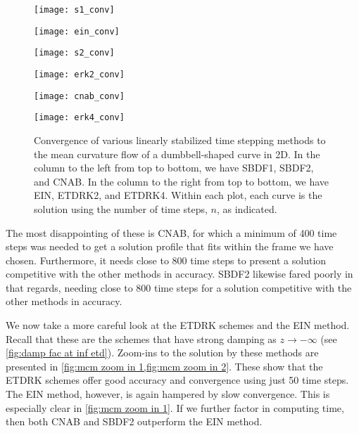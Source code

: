 \begin{figure}[htb!]
        \centering
\begin{minipage}{0.48\textwidth}
        \texttt{[image: s1\_conv]}
\end{minipage}
\begin{minipage}{0.48\textwidth}
        \texttt{[image: ein\_conv]}
\end{minipage}
\begin{minipage}{0.48\textwidth}
        \texttt{[image: s2\_conv]}
\end{minipage}
\begin{minipage}{0.48\textwidth}
        \texttt{[image: erk2\_conv]}
\end{minipage}
\begin{minipage}{0.48\textwidth}
        \texttt{[image: cnab\_conv]}
\end{minipage}
\begin{minipage}{0.48\textwidth}
        \texttt{[image: erk4\_conv]}
\end{minipage}
\caption[Convergence of linearly stabilized schemes to a shrinking dumbbell problem.]{Convergence of various linearly stabilized time stepping methods to the mean curvature flow of a dumbbell-shaped curve in 2D. In the column to the left from top to bottom, we have SBDF1, SBDF2, and CNAB. In the column to the right from top to bottom, we have EIN, ETDRK2, and ETDRK4. Within each plot, each curve is the solution using the number of time steps, $n$, as indicated.}
\label{fig:mcm 2d conv}
\end{figure}

The most disappointing of these is CNAB, for which a minimum of 400 time steps was needed to get a solution profile that fits within the frame we have chosen. Furthermore, it needs close to 800 time steps to present a solution competitive with the other methods in accuracy. SBDF2 likewise fared poorly in that regards, needing close to 800 time steps for a solution competitive with the other methods in accuracy. 

We now take a more careful look at the ETDRK schemes and the EIN method. Recall that these are the schemes that have strong damping as $z\to-\infty$ (see \cref{fig:damp fac at inf etd}). Zoom-ins to the solution by these methods are presented in \cref{fig:mcm zoom in 1,fig:mcm zoom in 2}. These show that the ETDRK schemes offer good accuracy and convergence using just 50 time steps. The EIN method, however, is again hampered by slow convergence. This is especially clear in \cref{fig:mcm zoom in 1}. If we further factor in computing time, then both CNAB and SBDF2 outperform the EIN method.

